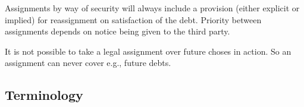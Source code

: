 \documentclass[
]{article}
\newenvironment{Shaded}{}{}
\newcommand{\NormalTok}[1]{#1}
\begin{document}
Assignments by way of security will always include a provision (either
explicit or implied) for reassignment on satisfaction of the debt.
Priority between assignments depends on notice being given to the third
party.

\begin{Shaded}
\begin{Highlighting}[]
\NormalTok{It is not possible to take a legal assignment over future choses in action. So an assignment can never cover e.g., future debts. }
\end{Highlighting}
\end{Shaded}

\hypertarget{terminology}{%
\subsection{Terminology}\label{terminology}}
\end{document}
